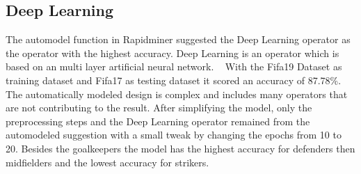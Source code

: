 \subsection{Deep Learning}

The automodel function in Rapidminer suggested the Deep Learning operator as the operator with the highest accuracy. Deep Learning is an operator which is based on an multi layer artificial neural network. ~\cite{ref_rapidminerDeepLearning} With the Fifa19 Dataset as training dataset and Fifa17 as testing dataset it scored an accuracy of 87.78\%. The automatically modeled design is complex and includes many operators that are not contributing to the result. After simplifying the model, only the preprocessing steps and the Deep Learning operator remained from the automodeled suggestion with a small tweak by changing the epochs from 10 to 20. %
Besides the goalkeepers the model has the highest accuracy for defenders then midfielders and the lowest accuracy for strikers.%

